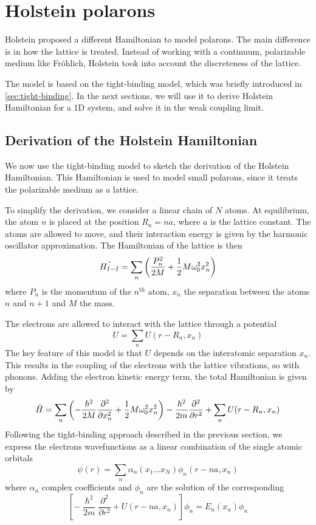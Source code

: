 \section{Holstein polarons}
Holstein proposed a different Hamiltonian to model polarons. The main difference is in how the lattice is treated. Instead of working with a continuum, polarizable medium like Fröhlich, Holstein took into account the discreteness of the lattice.

The model is based on the tight-binding model, which was briefly introduced in \cref{sec:tight-binding}. In the next sections, we will use it to derive Holstein Hamiltonian for a 1D system, and solve it in the weak coupling limit.

\subsection{Derivation of the Holstein Hamiltonian}
We now use the tight-binding model to sketch the derivation of the Holstein Hamiltonian. This Hamiltonian is used to model small polarons, since it treats the polarizable medium as a lattice.

To simplify the derivation, we consider a linear chain of $N$ atoms. At equilibrium, the atom $n$ is placed at the position $R_n = na$, where $a$ is the lattice constant. The atoms are allowed to move, and their interaction energy is given by the harmonic oscillator approximation. The Hamiltonian of the lattice is then
\begin{equation}
    \hat{H_{I-I}} = \sum_n \left( \frac{{P}_n^2}{2M} + \frac{1}{2} M\omega_0^2x_n^2 \right)
\end{equation}
where $P_n$ is the momentum of the $n^\text{th}$ atom, $x_n$ the separation between the atoms $n$ and $n+1$ and $M$ the mass.

The electrons are allowed to interact with the lattice through a potential
\begin{equation}
    U = \sum_n U(r-R_n, x_n)
\end{equation} The key feature of this model is that $U$ depends on the interatomic separation $x_n$. This results in the coupling of the electrons with the lattice vibrations, so with phonons. Adding the electron kinetic energy term, the total Hamiltonian is given by
\begin{equation}
    \hat{H} = \sum_n \left( -\frac{\hslash^2}{2M} \frac{\partial^2}{\partial x_n^2} + \frac{1}{2} M\omega_0^2x_n^2 \right)
    -\frac{\hslash^2}{2m} \frac{\partial^2}{\partial r^2}
    +     \sum_n U(r-R_n, x_n)
\end{equation}
Following the tight-binding approach described in the previous section, we express the electrons wavefunctions as a linear combination of the single atomic orbitals
\begin{equation}
    \psi(r) = \sum_{n} \alpha_{n}(x_1 \dots x_N) \phi_n(r-na, x_n)
\end{equation}
where $\alpha_n$ complex coefficients and $\phi_n$ are the solution of the corresponding \sche
\begin{equation}
    \left[ -\frac{\hslash^2}{2m} \frac{\partial^2}{\partial r^2} + U(r-na, x_n) \right] \phi_n = E_n(x_n) \phi_n
\end{equation}

